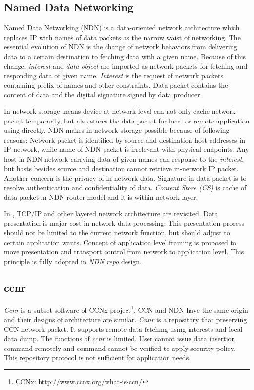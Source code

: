 \documentclass[conference]{IEEEtran}
\begin{document}
\subsection{Named Data Networking}
Named Data Networking (NDN) \cite{zhang2010named} is a data-oriented network architecture which replaces IP with names of data packets as the narrow waist of networking. The essential evolution of NDN is the change of network behaviors from delivering data to a certain destination to fetching data with a given name. \cite{zhang2010named} Because of this change, \emph{interest} and \emph{data object} are imported as network packets for fetching and responding data of given name. \emph{Interest} is the request of network packets containing prefix of names and other constraints. Data packet contains the content of data and the digital signature signed by data producer.

In-network storage means device at network level can not only cache network packet temporarily, but also stores the data packet for local or remote application using directly. NDN makes in-network storage possible because of following reasons: Network packet is identified by source and destination host addresses in IP network, while name of NDN packet is irrelevant with physical endpoints. Any host in NDN network carrying data of given names can response to the \emph{interest}, but hosts besides source and destination cannot retrieve in-network IP packet. Another concern is the privacy of in-network data. Signature in data packet is to resolve authentication and confidentiality of data. \emph{Content Store (CS)} is cache of data packet in NDN router model and it is within network layer.

In \cite{clark1990architectural}, TCP/IP and other layered network architecture are revisited. Data presentation is major cost in network data processing. This presentation process should not be limited to the current network function, but should adjust to certain application wants. Concept of application level framing is proposed to move presentation and transport control from network to application level. This principle is fully adopted in \emph{NDN repo} design.

\subsection{ccnr}

\emph{Ccnr} is a subset software of CCNx project\footnote{CCNx: http://www.ccnx.org/what-is-ccn/}. CCN and NDN have the same origin and their designs of architecture are similar. \emph{Cnnr} is a repository that preserving CCN network packet. It supports remote data fetching using interests and local data dump. The functions of \emph{ccnr} is limited. User cannot issue data insertion command remotely and command cannot be verified to apply security policy. This repository protocol is not sufficient for application needs.
\end{document}
